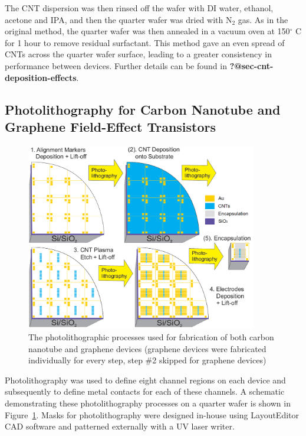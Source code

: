 \documentclass[
  letterpaper,
  DIV=11,
  numbers=noendperiod]{scrartcl}
\begin{document}
The CNT dispersion was then rinsed off the wafer with DI water, ethanol,
acetone and IPA, and then the quarter wafer was dried with N\(_2\) gas.
As in the original method, the quarter wafer was then annealed in a
vacuum oven at 150\(^\circ\) C for 1 hour to remove residual surfactant.
This method gave an even spread of CNTs across the quarter wafer
surface, leading to a greater consistency in performance between
devices. Further details can be found in
\textbf{?@sec-cnt-deposition-effects}.

\hypertarget{photolithography-for-carbon-nanotube-and-graphene-field-effect-transistors}{%
\subsection{Photolithography for Carbon Nanotube and Graphene
Field-Effect
Transistors}\label{photolithography-for-carbon-nanotube-and-graphene-field-effect-transistors}}

\begin{figure}

{\centering \includegraphics[width=0.9\textwidth,height=\textheight]{figures/ch4/photolithography-cycle.png}

}

\caption{\label{fig-qw-photolithography}The photolithographic processes
used for fabrication of both carbon nanotube and graphene devices
(graphene devices were fabricated individually for every step, step \#2
skipped for graphene devices)}

\end{figure}

Photolithography was used to define eight channel regions on each device
and subsequently to define metal contacts for each of these channels. A
schematic demonstrating these photolithography processes on a quarter
wafer is shown in Figure~\ref{fig-qw-photolithography}. Masks for
photolithography were designed in-house using LayoutEditor CAD software
and patterned externally with a UV laser writer.
\end{document}
